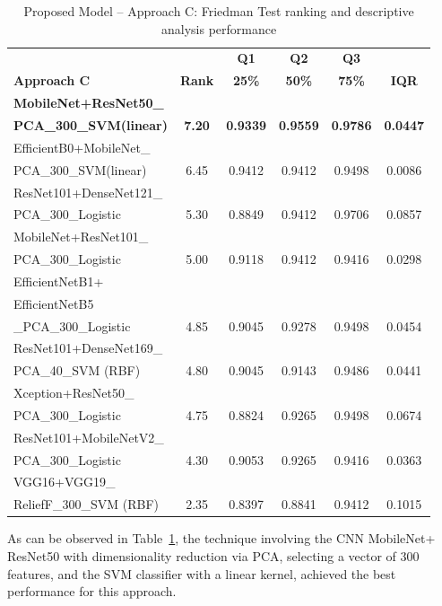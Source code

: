 \documentclass[preprint,12pt]{elsarticle}
\begin{document}
\begin{table}[h!]
	\caption{Proposed Model – Approach C: Friedman Test ranking and descriptive analysis performance}
	\label{tab:Approach_C_ranking}
	\centering
	\begin{tabular}{|l|c|c|c|c|c|}
		\hline
		\textbf{} & \textbf{} & \textbf{Q1} & \textbf{Q2} & \textbf{Q3} & \textbf{} \\
		\textbf{Approach C} & \textbf{Rank} & \textbf{25\%} & \textbf{50\%} & \textbf{75\%} & \textbf{IQR} \\
		\hline
		\textbf{MobileNet+ResNet50\_} &  & &  &  &  \\
		\textbf{PCA\_300\_SVM(linear)} & \textbf{7.20} & \textbf{0.9339} & \textbf{0.9559} & \textbf{0.9786} & \textbf{0.0447} \\
		EfficientB0+MobileNet\_ & & & & & \\
		PCA\_300\_SVM(linear) & 6.45 & 0.9412 & 0.9412 & 0.9498 & 0.0086 \\
		ResNet101+DenseNet121\_ & & & & &  \\
		PCA\_300\_Logistic & 5.30 & 0.8849 & 0.9412 & 0.9706 & 0.0857 \\
		MobileNet+ResNet101\_ & & & & &  \\
		PCA\_300\_Logistic & 5.00 & 0.9118 & 0.9412 & 0.9416 & 0.0298 \\
		EfficientNetB1+ &  & &  & & \\
		EfficientNetB5 &  & &  & & \\
		\_PCA\_300\_Logistic & 4.85 & 0.9045 & 0.9278 & 0.9498 & 0.0454 \\
		ResNet101+DenseNet169\_ & & & & & \\
		PCA\_40\_SVM (RBF) & 4.80 & 0.9045 & 0.9143 & 0.9486 & 0.0441 \\
		Xception+ResNet50\_ & & & & &  \\
		PCA\_300\_Logistic & 4.75 & 0.8824 & 0.9265 & 0.9498 & 0.0674 \\
		ResNet101+MobileNetV2\_ &  &  &  &  &  \\
		PCA\_300\_Logistic & 4.30 & 0.9053 & 0.9265 & 0.9416 & 0.0363 \\
		VGG16+VGG19\_ &  &  & &  &  \\
		ReliefF\_300\_SVM (RBF) & 2.35 & 0.8397 & 0.8841 & 0.9412 & 0.1015 \\
		\hline
	\end{tabular}
\end{table}

As can be observed in Table~\ref{tab:Approach_C_ranking}, the technique involving the CNN MobileNet+ ResNet50 with dimensionality reduction via PCA, selecting a vector of 300 features, and the SVM classifier with a linear kernel, achieved the best performance for this approach.
\end{document}
